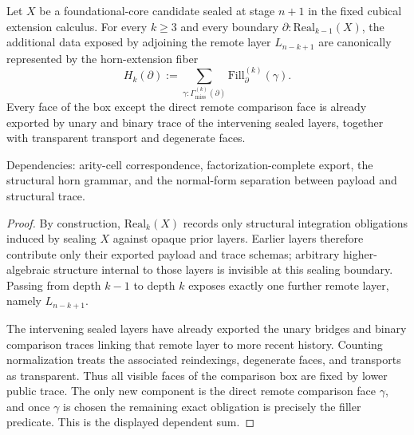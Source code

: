 \documentclass{lmcs}
\begin{document}
\begin{lem}
\label{lem:syntactic-horn-reduction}
Let \(X\) be a foundational-core candidate sealed at stage \(n+1\) in the fixed cubical
extension calculus.  For every \(k\geq 3\) and every boundary
\(\partial:\mathrm{Real}_{k-1}(X)\), the additional data exposed by adjoining the remote layer
\(L_{n-k+1}\) are canonically represented by the horn-extension fiber
\[
  H_k(\partial)
  :=
  \sum_{\gamma:\Gamma_{\mathrm{miss}}^{(k)}(\partial)}
  \mathrm{Fill}^{(k)}_{\partial}(\gamma).
\]
Every face of the box except the direct remote comparison face is already exported by unary
and binary trace of the intervening sealed layers, together with transparent transport and
degenerate faces.

Dependencies: arity-cell correspondence, factorization-complete export, the structural horn
grammar, and the normal-form separation between payload and structural trace.
\end{lem}

\begin{proof}
By construction, \(\mathrm{Real}_k(X)\) records only structural integration obligations induced
by sealing \(X\) against opaque prior layers.  Earlier layers therefore contribute only their
exported payload and trace schemas; arbitrary higher-algebraic structure internal to those
layers is invisible at this sealing boundary.  Passing from depth \(k-1\) to depth \(k\)
exposes exactly one further remote layer, namely \(L_{n-k+1}\).

The intervening sealed layers have already exported the unary bridges and binary comparison
traces linking that remote layer to more recent history.  Counting normalization treats the
associated reindexings, degenerate faces, and transports as transparent.  Thus all visible
faces of the comparison box are fixed by lower public trace.  The only new component is the
direct remote comparison face \(\gamma\), and once \(\gamma\) is chosen the remaining exact
obligation is precisely the filler predicate.  This is the displayed dependent sum.
\end{proof}
\end{document}
